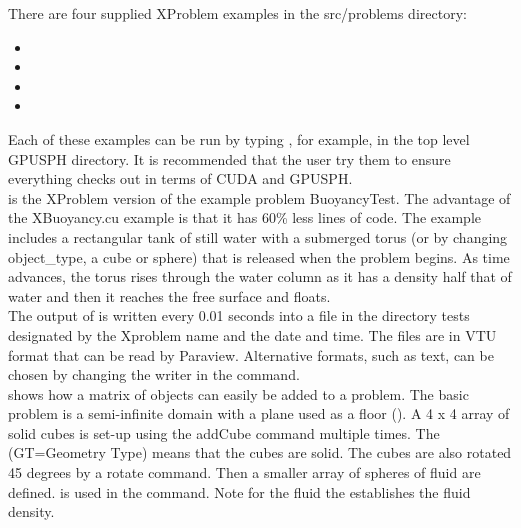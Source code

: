 There are four supplied XProblem examples in the src/problems directory:\\
\begin{itemize}
\item	{}
\item	{}
\item	{}
\item	{}
\end{itemize}
Each of these examples can be run by typing , 
for example,  in the top level GPUSPH directory.  
It is recommended that the user try them to ensure 
everything checks out in terms of CUDA and GPUSPH. \\

 is the XProblem version of the example problem BuoyancyTest. 
The advantage of the XBuoyancy.cu example is that it has 60\% less lines of code.
The example includes a rectangular tank of still water with a submerged torus 
(or by changing object_type, a cube or sphere) that is released when the problem begins.  
As time advances, the torus rises through the water column as it has a 
density half that of water and then it reaches the free surface and floats.  \\

The output of  is written every 0.01 seconds into a file 
in the directory tests designated by the Xproblem name and the date and time.  
The files are in VTU format that can be read by Paraview.  
Alternative formats, such as text, can be chosen by changing the writer in the  command. \\

 shows how a matrix of objects can easily be added to a problem.  
The basic problem is a semi-infinite domain with a plane used as a floor ().  
A 4 x 4 array of solid cubes is set-up using the addCube command multiple times.   
The   (GT=Geometry Type) means that the cubes are solid. 
The cubes are also rotated 45 degrees by a rotate command. 
Then a smaller array of spheres of fluid are defined.  
 is used in the  command.  
Note for the fluid the  establishes the fluid density.  \\

